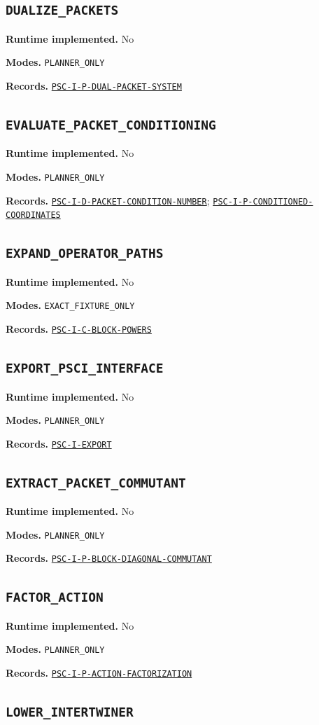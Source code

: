 \documentclass[a4paper,11pt]{article}
\newcommand{\field}[2]{\noindent\textbf{#1.} #2\par}
\begin{document}
\subsection*{\nolinkurl{DUALIZE_PACKETS}}
\field{Runtime implemented}{No}
\field{Modes}{\nolinkurl{PLANNER_ONLY}}
\field{Records}{\hyperref[rec:PSC-I-P-DUAL-PACKET-SYSTEM]{\nolinkurl{PSC-I-P-DUAL-PACKET-SYSTEM}}}
\subsection*{\nolinkurl{EVALUATE_PACKET_CONDITIONING}}
\field{Runtime implemented}{No}
\field{Modes}{\nolinkurl{PLANNER_ONLY}}
\field{Records}{\hyperref[rec:PSC-I-D-PACKET-CONDITION-NUMBER]{\nolinkurl{PSC-I-D-PACKET-CONDITION-NUMBER}}; \hyperref[rec:PSC-I-P-CONDITIONED-COORDINATES]{\nolinkurl{PSC-I-P-CONDITIONED-COORDINATES}}}
\subsection*{\nolinkurl{EXPAND_OPERATOR_PATHS}}
\field{Runtime implemented}{No}
\field{Modes}{\nolinkurl{EXACT_FIXTURE_ONLY}}
\field{Records}{\hyperref[rec:PSC-I-C-BLOCK-POWERS]{\nolinkurl{PSC-I-C-BLOCK-POWERS}}}
\subsection*{\nolinkurl{EXPORT_PSCI_INTERFACE}}
\field{Runtime implemented}{No}
\field{Modes}{\nolinkurl{PLANNER_ONLY}}
\field{Records}{\hyperref[rec:PSC-I-EXPORT]{\nolinkurl{PSC-I-EXPORT}}}
\subsection*{\nolinkurl{EXTRACT_PACKET_COMMUTANT}}
\field{Runtime implemented}{No}
\field{Modes}{\nolinkurl{PLANNER_ONLY}}
\field{Records}{\hyperref[rec:PSC-I-P-BLOCK-DIAGONAL-COMMUTANT]{\nolinkurl{PSC-I-P-BLOCK-DIAGONAL-COMMUTANT}}}
\subsection*{\nolinkurl{FACTOR_ACTION}}
\field{Runtime implemented}{No}
\field{Modes}{\nolinkurl{PLANNER_ONLY}}
\field{Records}{\hyperref[rec:PSC-I-P-ACTION-FACTORIZATION]{\nolinkurl{PSC-I-P-ACTION-FACTORIZATION}}}
\subsection*{\nolinkurl{LOWER_INTERTWINER}}
\end{document}
